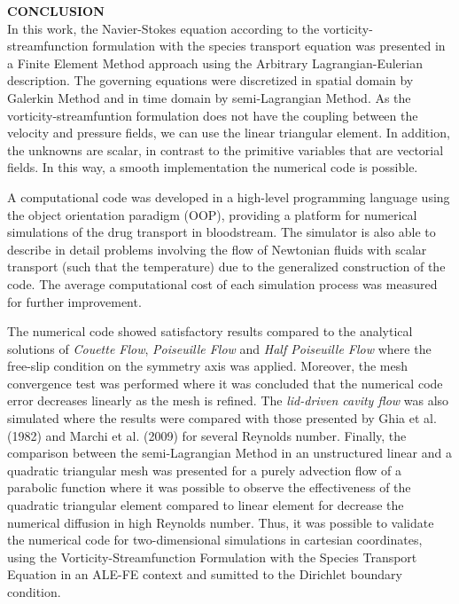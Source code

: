 	\clearpage
	\noindent\textbf{CONCLUSION}
	$\!$\\

	In this work, the Navier-Stokes equation according to the 
	vorticity-streamfunction formulation with the species transport 
	equation was presented in a Finite Element Method approach
	using the Arbitrary Lagrangian-Eulerian description.
	The governing equations were discretized in spatial domain by
	Galerkin Method and in time domain by semi-Lagrangian Method. 
	As the vorticity-streamfuntion formulation does not have the 
	coupling between the velocity and pressure fields, we can use the 
linear triangular element. In addition, the unknowns are scalar,
in contrast to the primitive variables that are vectorial fields.
In this way, a smooth implementation 
the numerical code is possible.

\medskip
A computational code was developed in a high-level programming language 
using the object orientation paradigm (OOP), 
providing a platform for numerical
simulations of the drug transport in bloodstream. The simulator 
is also able to describe in detail problems involving the flow 
of Newtonian fluids with scalar transport 
(such that the temperature) due to the generalized 
construction of the code. The average computational cost of 
each simulation process was measured for further improvement.
 

\medskip
The numerical code showed satisfactory results compared to the 
analytical solutions of \textit{Couette Flow}, 
\textit{Poiseuille Flow} and \textit{Half Poiseuille Flow} 
where the free-slip condition on the symmetry axis was applied. 
Moreover, the mesh convergence test was performed where
it was concluded that the numerical code error decreases linearly
as the mesh is refined.
The \textit{lid-driven cavity flow} was also simulated where the 
results were compared with those presented by Ghia et al. (1982) 
\cite{ghia1982} and Marchi et al. (2009) \cite{marchi2009} 
for several Reynolds number. Finally, the comparison between the
semi-Lagrangian Method in an unstructured linear and a quadratic
triangular mesh was
presented for a purely advection flow of a parabolic function 
where it was possible to observe the effectiveness of the
quadratic triangular element compared to linear element
for decrease the numerical diffusion in high Reynolds number.
Thus, it was possible to validate the numerical code
for two-dimensional simulations in cartesian coordinates,
using the Vorticity-Streamfunction Formulation
with the Species Transport Equation in an ALE-FE context
and sumitted to the Dirichlet boundary condition.



